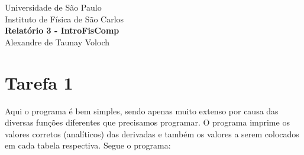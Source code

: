 \documentclass[12pt,a4paper]{article}
\begin{document}
	\begin{titlepage}
		\begin{center}
			\large Universidade de São Paulo\\[0.2cm]
			\large Instituto de Física de São Carlos\\[7cm]
			\huge \textbf{Relatório 3 - IntroFisComp}\\[6cm]
			
			\large Alexandre de Taunay Voloch \\[0.2cm]
		\end{center}
	\end{titlepage}

\section{Tarefa 1}

Aqui o programa é bem simples, sendo apenas muito extenso por causa das diversas funções diferentes que precisamos programar. O programa imprime os valores corretos (analíticos) das derivadas e também os valores a serem colocados em cada tabela respectiva. Segue o programa:
\end{document}
